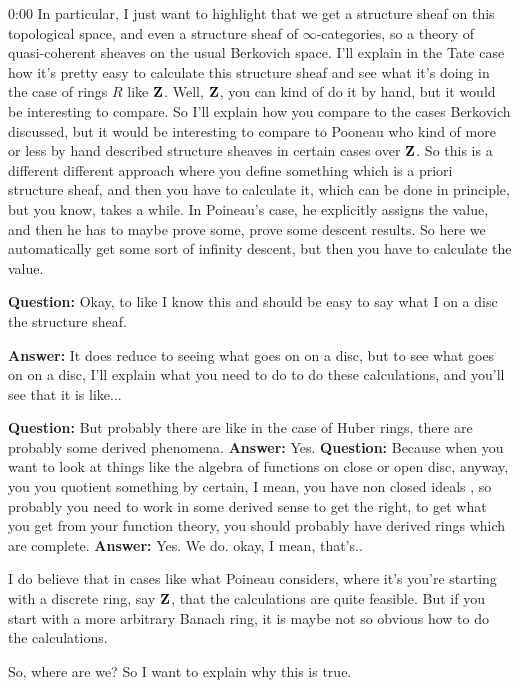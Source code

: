 \begin{unfinished}{0:00}
In particular, I just want to highlight that we get a structure sheaf on this topological space, and even a structure sheaf of $\infty$-categories, so a theory of quasi-coherent sheaves on the usual Berkovich space. 
I'll explain in the Tate case how it's pretty easy to calculate this structure sheaf and see what it's doing in the case of rings $R$ like $\mathbf Z$. Well, $\mathbf Z$, you can kind of do it by hand, but it would be interesting to compare. 
So I'll explain how you compare to the cases Berkovich discussed, but it would be interesting to compare to Pooneau \citeme{} who kind of more or less by hand described structure sheaves in certain cases over $\mathbf Z$. So this is a different different approach where you define something which is a priori structure sheaf, and then you have to calculate it, which can be done in principle, but you know, takes a while. In Poineau's case, he explicitly assigns the value, and then he has to maybe prove some, prove some descent results. So here we automatically get some sort of infinity descent, but then you have to calculate the value.

\textbf{Question:} Okay, to like I know this and should be easy to say what I on a disc the structure sheaf. 

\textbf{Answer:} It does reduce to seeing what goes on on a disc, but to see what goes on on a disc, I'll explain what you need to do to do these calculations, and you'll see that it is like...

\textbf{Question:} But probably there are like in the case of Huber rings, there are probably some derived phenomena.
\textbf{Answer:} Yes.
\textbf{Question:} Because when you want to look at things like the algebra of functions on close or open disc, anyway, you you quotient something by certain, I mean, you have non closed ideals , so probably you need to work in some derived sense to get the right, to get what you get from your function theory, you should probably have derived rings which are complete. 
\textbf{Answer:} Yes. We do. okay, I mean, that's..

I do believe that in cases like what Poineau considers, where it's you're starting with a discrete ring, say $\mathbf Z$, that the calculations are quite feasible.
But if you start with a more arbitrary Banach ring, it is maybe not so obvious how to do the calculations.

So, where are we?
So I want to explain why this is true. 


\end{unfinished}

